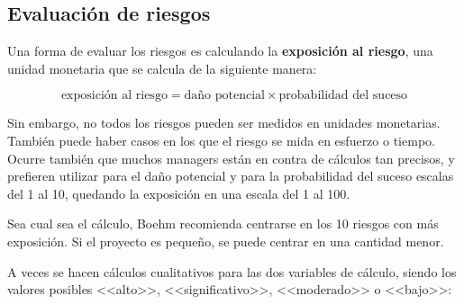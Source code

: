 \documentclass[12pt]{article}
\begin{document}
\subsection{Evaluación de riesgos}
\label{7.6.0}

{Una forma de evaluar los riesgos es calculando la \textbf{exposición al riesgo}, una unidad monetaria que se calcula de la siguiente manera:}

\begin{equation}
    \text{exposición al riesgo} = \text{daño potencial} \times \text{probabilidad del suceso}
\end{equation}

{Sin embargo, no todos los riesgos pueden ser medidos en unidades monetarias. También puede haber casos en los que el riesgo se mida en esfuerzo o tiempo. Ocurre también que muchos managers están en contra de cálculos tan precisos, y prefieren utilizar para el daño potencial y para la probabilidad del suceso escalas del 1 al 10, quedando la exposición en una escala del 1 al 100.} \bigskip

{Sea cual sea el cálculo, Boehm recomienda centrarse en los 10 riesgos con más exposición. Si el proyecto es pequeño, se puede centrar en una cantidad menor.}

\newpage
{A veces se hacen cálculos cualitativos para las dos variables de cálculo, siendo los valores posibles <<alto>>, <<significativo>>, <<moderado>> o <<bajo>>:}

\begin{table}[ht]
\centering
{}
\caption{Descriptores cualitativos}
\label{tab:7.1}
\end{table}
\end{document}
